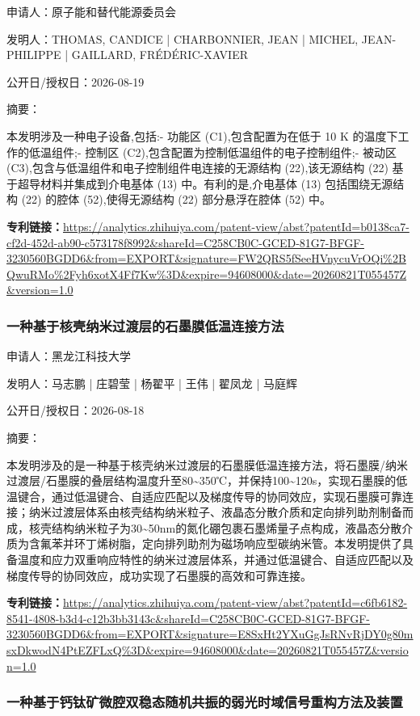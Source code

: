 \documentclass[12pt,a4paper]{ctexart}
\begin{document}
申请人：原子能和替代能源委员会

发明人：THOMAS, CANDICE | CHARBONNIER, JEAN | MICHEL, JEAN-PHILIPPE | GAILLARD, FRÉDÉRIC-XAVIER

公开日/授权日：2026-08-19

摘要：

本发明涉及一种电子设备,包括:- 功能区 (C1),包含配置为在低于 10 K 的温度下工作的低温组件;- 控制区 (C2),包含配置为控制低温组件的电子控制组件;- 被动区 (C3),包含与低温组件和电子控制组件电连接的无源结构 (22),该无源结构 (22) 基于超导材料并集成到介电基体 (13) 中。有利的是,介电基体 (13) 包括围绕无源结构 (22) 的腔体 (52),使得无源结构 (22) 部分悬浮在腔体 (52) 中。

\noindent\textbf{专利链接：}\url{https://analytics.zhihuiya.com/patent-view/abst?patentId=b0138ca7-cf2d-452d-ab90-c573178f8992&shareId=C258CB0C-GCED-81G7-BFGF-3230560BGDD6&from=EXPORT&signature=FW2QRS5fSeeHVnycuVrOQi%2BQwuRMo%2Fyh6xotX4Ff7Kw%3D&expire=94608000&date=20260821T055457Z&version=1.0}

\subsubsection{ 一种基于核壳纳米过渡层的石墨膜低温连接方法 }

申请人：黑龙江科技大学

发明人：马志鹏 | 庄碧莹 | 杨翟平 | 王伟 | 翟凤龙 | 马庭辉

公开日/授权日：2026-08-18

摘要：

本发明涉及的是一种基于核壳纳米过渡层的石墨膜低温连接方法，将石墨膜/纳米过渡层/石墨膜的叠层结构温度升至80\textasciitilde{}350℃，并保持100\textasciitilde{}120s，实现石墨膜的低温键合，通过低温键合、自适应匹配以及梯度传导的协同效应，实现石墨膜可靠连接；纳米过渡层体系由核壳结构纳米粒子、液晶态分散介质和定向排列助剂制备而成，核壳结构纳米粒子为30\textasciitilde{}50nm的氮化硼包裹石墨烯量子点构成，液晶态分散介质为含氟苯并环丁烯树脂，定向排列助剂为磁场响应型碳纳米管。本发明提供了具备温度和应力双重响应特性的纳米过渡层体系，并通过低温键合、自适应匹配以及梯度传导的协同效应，成功实现了石墨膜的高效和可靠连接。

\noindent\textbf{专利链接：}\url{https://analytics.zhihuiya.com/patent-view/abst?patentId=c6fb6182-8541-4808-b3d4-c12b3bb3143c&shareId=C258CB0C-GCED-81G7-BFGF-3230560BGDD6&from=EXPORT&signature=E8SxHt2YXuGgJsRNvRjDY0g80msxDkwodN4PtEZFLxQ%3D&expire=94608000&date=20260821T055457Z&version=1.0}

\subsubsection{ 一种基于钙钛矿微腔双稳态随机共振的弱光时域信号重构方法及装置 }
\end{document}
